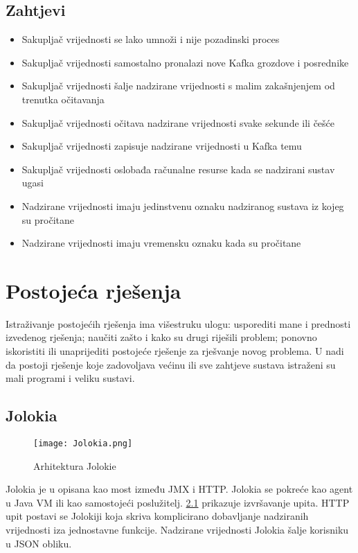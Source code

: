 \documentclass[times, utf8, diplomski, numeric]{fer}
\begin{document}
\section{Zahtjevi}

\begin{itemize}
    \item Sakupljač vrijednosti se lako umnoži i nije pozadinski proces
    \item Sakupljač vrijednosti samostalno pronalazi nove Kafka grozdove i posrednike
    \item Sakupljač vrijednosti šalje nadzirane vrijednosti s malim zakašnjenjem od trenutka očitavanja
    \item Sakupljač vrijednosti očitava nadzirane vrijednosti svake sekunde ili češće
    \item Sakupljač vrijednosti zapisuje nadzirane vrijednosti u Kafka temu
    \item Sakupljač vrijednosti oslobađa računalne resurse kada se nadzirani sustav ugasi
    \item Nadzirane vrijednosti imaju jedinstvenu oznaku nadziranog sustava iz kojeg su pročitane
    \item Nadzirane vrijednosti imaju vremensku oznaku kada su pročitane
\end{itemize}

\chapter{Postojeća rješenja}

Istraživanje postojećih rješenja ima višestruku ulogu: usporediti mane i prednosti izvedenog rješenja; naučiti zašto i kako su drugi riješili problem; ponovno iskoristiti ili unaprijediti postojeće rješenje za rješvanje novog problema. U nadi da postoji rješenje koje zadovoljava većinu ili sve zahtjeve sustava istraženi su mali programi i veliku sustavi.

\section{Jolokia}

\begin{figure}[H]
    \centering
    \texttt{[image: Jolokia.png]}
    \caption{Arhitektura Jolokie}
    \label{fig:jolokia}
\end{figure}

Jolokia je u \citep{jolokia} opisana kao most između JMX i HTTP. Jolokia se pokreće kao agent u Java VM ili kao samostojeći poslužitelj. \ref{fig:jolokia} prikazuje izvršavanje upita. HTTP upit postavi se Jolokiji koja skriva komplicirano dobavljanje nadziranih vrijednosti iza jednostavne funkcije. Nadzirane vrijednosti Jolokia šalje korisniku u JSON obliku.
\end{document}
